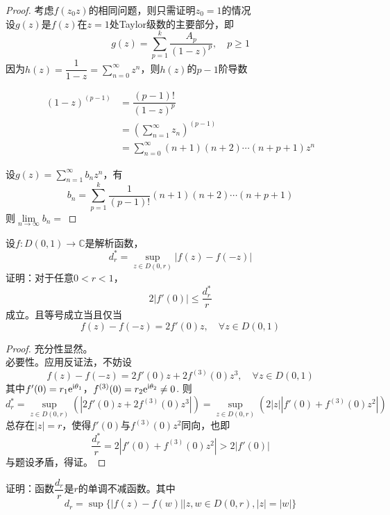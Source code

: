 \begin{proof}
    
    考虑$f(z_0z)$的相同问题，则只需证明$z_0 = 1$的情况\\
    设$g(z)$是$f(z)$在$z=1$处\textup{Taylor}级数的主要部分，即
    $$g(z) = \sum\limits_{p=1}^{k}{\dfrac{A_p}{(1-z)^p}},\quad p \geq 1$$
    因为$h(z) = \dfrac{1}{1-z} = \sum\limits_{n=0}^{\infty}{z^n}$，则$h(z)$的$p-1$阶导数
    
    \begin{align*}
        (1-z)^{(p-1)} & = \dfrac{(p-1)!}{(1-z)^p}\\
        & = \left(\sum\limits_{n=1}^{\infty}{z_n}\right)^{(p-1)}\\
        & = \sum\limits_{n=0}^{\infty}{(n+1)(n+2)\cdots(n+p+1)z^n}
    \end{align*}

    设$g(z) = \sum\limits_{n=1}^{\infty}{b_nz^n}$，有
    $$b_n = \sum\limits_{p=1}^{k}{\dfrac{1}{(p-1)!}(n+1)(n+2)\cdots(n+p+1)}$$
    则$\lim\limits_{n\to\infty}{b_n} = $

\end{proof}

\begin{proposition}

    设$f : D(0,1) \to \mathbb{C}$是解析函数，
    $$d_r^{*} = \sup\limits_{z \in D(0,r)}{|f(z) - f(-z)|}$$
    证明：对于任意$0 < r < 1$，
    $$2|f'(0)| \leq \dfrac{d_r^{*}}{r}$$
    成立。且等号成立当且仅当
    $$f(z) - f(-z) = 2f'(0)z, \quad \forall z \in D(0,1)$$

\end{proposition}

\begin{proof}

    充分性显然。\\
    必要性。应用反证法，不妨设
    $$f(z) - f(-z) = 2f'(0)z + 2f^{(3)}(0)z^3, \quad \forall z \in D(0,1)$$
    其中$f'(0) = r_1\mathrm{e}^{\mathrm{i} \theta_1}$，$f^{(3)}(0) = r_2\mathrm{e}^{\mathrm{i} \theta_2} \neq 0$. 则
    $$d_r^{*} = \sup\limits_{z \in D(0,r)}{(|2f'(0)z + 2f^{(3)}(0)z^3|)} = \sup\limits_{z \in D(0,r)}{(2|z||f'(0) + f^{(3)}(0)z^2|)}$$
    总存在$|z| = r$，使得$f'(0)$与$f^{(3)}(0)z^2$同向，也即
    $$\dfrac{d_r^{*}}{r} = 2|f'(0) + f^{(3)}(0)z^2| > 2|f'(0)|$$
    与题设矛盾，得证。

\end{proof}

\begin{proposition}

    证明：函数$\dfrac{d_r}{r}$是$r$的单调不减函数。其中
    $$d_r = \sup\{|f(z) - f(w)|\big| z,w \in D(0,r), |z| = |w|\}$$

\end{proposition}

